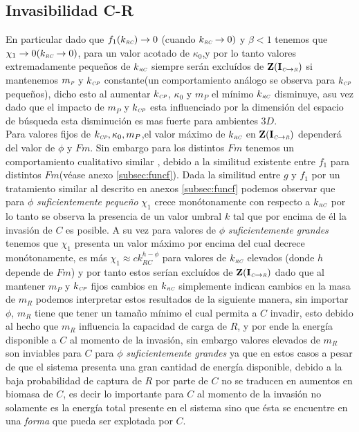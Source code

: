 \subsection{Invasibilidad C-R}\label{subsec:InvCR}

En particular dado que $f_1(k_{\textit{\tiny RC}}) \to 0$ (cuando $k_{\textit{\tiny RC}} \to 0)$ y $\beta <1$ tenemos que $\chi_1 \to 0 (k_{\textit{\tiny RC}} \to 0)$, para un valor acotado de $\kappa_0$,y por lo tanto valores extremadamente peque\~nos de $k_{\textit{\tiny RC}}$ siempre ser\'an exclu\'idos de $\mathbf{Z(I_{\textit{\tiny C}\to \textit{\tiny R}})}$ si mantenemos $m_{\textit{\tiny P}}$ y $k_{\textit{\tiny CP}}$ constante(un comportamiento an\'alogo se observa para $k_{\textit{\tiny CP}}$ peque\~nos), dicho esto al aumentar $k_{\textit{\tiny CP}}$, $\kappa_0$ y $m_P$ el m\'inimo $k_{\textit{\tiny RC}}$ disminuye, asu vez dado que el impacto de $m_P$ y $k_{\textit{\tiny CP}}$ esta influenciado por la dimensi\'on del espacio de b\'usqueda esta disminuci\'on es mas fuerte para ambientes $3D$.\\

Para valores fijos de $k_{\textit{\tiny CP}}, \kappa_0 ,m_P$,el valor m\'aximo de $k_{\textit{\tiny RC}}$ en $\mathbf{Z(I_{\textit{\tiny C}\to \textit{\tiny R}})}$ depender\'a del valor de $\phi$ y $Fm$. Sin embargo para los distintos $Fm$ tenemos un comportamiento cualitativo similar , debido a la similitud existente entre $f_1$ para distintos $Fm$(v\'ease anexo \ref{subsec:funcf}). Dada la similitud entre $g$ y $f_1$ por un tratamiento similar al descrito en anexos \ref{subsec:funcf} podemos observar que para $\phi$ \emph{suficientemente peque\~no} $\chi_1$ crece mon\'otonamente con respecto a $k_{\textit{\tiny RC}}$ por lo tanto se observa la presencia de un valor umbral $k$ tal que por encima de \'el la invasi\'on de $C$ es posible. A su vez para valores de $\phi$ \emph{suficientemente grandes} tenemos que $\chi_1$ presenta un valor m\'aximo por encima del cual decrece mon\'otonamente, es m\'as $\chi_1 \approx c k_{RC}^{h - \phi}$ para valores de $k_{\textit{\tiny RC}}$ elevados (donde $h$ depende de $Fm$) y por tanto estos ser\'ian exclu\'idos de $\mathbf{Z(I_{\textit{\tiny C}\to \textit{\tiny R}})}$ dado que al mantener $m_P$ y $k_{\textit{\tiny CP}}$ fijos cambios en $k_{\textit{\tiny RC}}$ simplemente indican cambios en la masa de $m_R$ podemos interpretar estos resultados de la siguiente manera, sin importar $\phi$, $m_R$ tiene que tener un tama\~no m\'inimo el cual permita a $C$ invadir, esto debido al hecho que $m_R$ influencia la capacidad de carga de $R$, y por ende la energ\'ia disponible a $C$ al momento de la invasi\'on, sin embargo valores elevados de $m_R$ son inviables para $C$ para $\phi$ \emph{suficientemente grandes} ya que en estos casos a pesar de que el sistema presenta una gran cantidad de energ\'ia disponible, debido a la baja probabilidad de captura de $R$ por parte de $C$ no se traducen en aumentos en biomasa de $C$, es decir lo importante para $C$ al momento de la invasi\'on no solamente es la energ\'ia total presente en el sistema sino que \'esta se encuentre en una \emph{forma} que pueda ser explotada por $C$.\\

